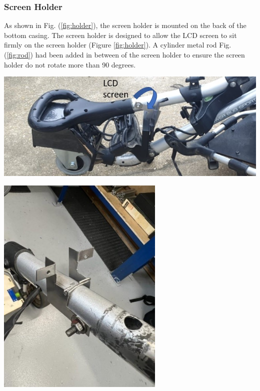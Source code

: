 \documentclass[11pt,landscape]{article}
\newenvironment{Figure}
  {\par\medskip\noindent\minipage{\linewidth}}
  {\endminipage\par\medskip}
\begin{document}
\begin{multicols}{3}
    \subsubsection{Screen Holder}
    As shown in Fig. (\ref{fig:holder}), the screen holder is mounted on the
    back of the bottom casing. The screen holder is designed to allow the LCD
    screen to sit firmly on the screen holder (Figure \ref{fig:holder}). A
    cylinder metal rod Fig. (\ref{fig:rod}) had been added in between of the
    screen holder to ensure the screen holder do not rotate more than 90 degrees.
    
    \begin{Figure}
        \begin{center}
            \includegraphics[width=\textwidth]{Figure39.jpg}
            \label{fig:holder}
        \end{center}
    \end{Figure}
    
    \begin{Figure}
        \begin{center}
            \includegraphics[width=0.6\textwidth]{Figure31.jpg}
            \label{fig:rod}
        \end{center}
    \end{Figure}
    

\end{multicols}
\end{document}
